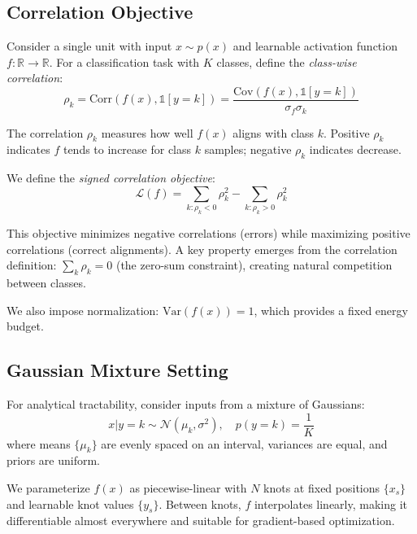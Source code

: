 \documentclass{article}
\begin{document}
\subsection{Correlation Objective}

Consider a single unit with input $x \sim p(x)$ and learnable activation function $f: \mathbb{R} \to \mathbb{R}$. For a classification task with $K$ classes, define the \textit{class-wise correlation}:
\begin{equation}
\rho_k = \text{Corr}(f(x), \mathbb{1}[y=k]) = \frac{\text{Cov}(f(x), \mathbb{1}[y=k])}{\sigma_f \sigma_k}
\end{equation}

The correlation $\rho_k$ measures how well $f(x)$ aligns with class $k$. Positive $\rho_k$ indicates $f$ tends to increase for class $k$ samples; negative $\rho_k$ indicates decrease.

We define the \textit{signed correlation objective}:
\begin{equation}
\mathcal{L}(f) = \sum_{k: \rho_k < 0} \rho_k^2 - \sum_{k: \rho_k > 0} \rho_k^2
\label{eq:objective}
\end{equation}

This objective minimizes negative correlations (errors) while maximizing positive correlations (correct alignments). A key property emerges from the correlation definition: $\sum_k \rho_k = 0$ (the zero-sum constraint), creating natural competition between classes.

We also impose normalization: $\text{Var}(f(x)) = 1$, which provides a fixed energy budget.

\subsection{Gaussian Mixture Setting}

For analytical tractability, consider inputs from a mixture of Gaussians:
\begin{equation}
x | y=k \sim \mathcal{N}(\mu_k, \sigma^2), \quad p(y=k) = \frac{1}{K}
\end{equation}
where means $\{\mu_k\}$ are evenly spaced on an interval, variances are equal, and priors are uniform.

We parameterize $f(x)$ as piecewise-linear with $N$ knots at fixed positions $\{x_s\}$ and learnable knot values $\{y_s\}$. Between knots, $f$ interpolates linearly, making it differentiable almost everywhere and suitable for gradient-based optimization.
\end{document}
